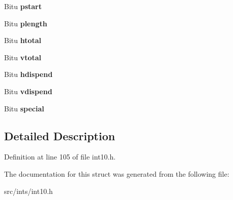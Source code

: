 \begin{DoxyCompactItemize}
\item 
\hypertarget{structVideoModeBlock_ae53459e4e4978f0262a8008199fd1837}{Bitu {\bfseries pstart}}\label{structVideoModeBlock_ae53459e4e4978f0262a8008199fd1837}

\item 
\hypertarget{structVideoModeBlock_ac61dd9ff708f53231ca143d564133e29}{Bitu {\bfseries plength}}\label{structVideoModeBlock_ac61dd9ff708f53231ca143d564133e29}

\item 
\hypertarget{structVideoModeBlock_acb39e7559e59d3d9527c0a46499a423e}{Bitu {\bfseries htotal}}\label{structVideoModeBlock_acb39e7559e59d3d9527c0a46499a423e}

\item 
\hypertarget{structVideoModeBlock_a8f86cecb0e1da8e4092ba9a8b8c7eaaa}{Bitu {\bfseries vtotal}}\label{structVideoModeBlock_a8f86cecb0e1da8e4092ba9a8b8c7eaaa}

\item 
\hypertarget{structVideoModeBlock_a7d7c7b224dfdb93cfb1af7fed4a5c9cf}{Bitu {\bfseries hdispend}}\label{structVideoModeBlock_a7d7c7b224dfdb93cfb1af7fed4a5c9cf}

\item 
\hypertarget{structVideoModeBlock_a4b3b1f96351ad6e6c435ff27953b7526}{Bitu {\bfseries vdispend}}\label{structVideoModeBlock_a4b3b1f96351ad6e6c435ff27953b7526}

\item 
\hypertarget{structVideoModeBlock_abcb9b2b01871da775e89519c4dcb8d0c}{Bitu {\bfseries special}}\label{structVideoModeBlock_abcb9b2b01871da775e89519c4dcb8d0c}

\end{DoxyCompactItemize}


\subsection{Detailed Description}


Definition at line 105 of file int10.\-h.



The documentation for this struct was generated from the following file\-:\begin{DoxyCompactItemize}
\item 
src/ints/int10.\-h\end{DoxyCompactItemize}
